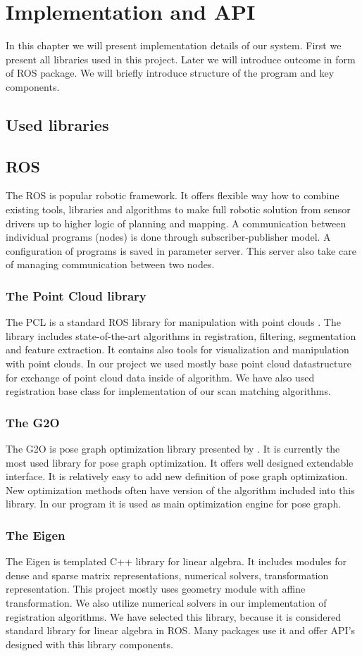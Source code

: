 \chapter{Implementation and API}
In this chapter we will present implementation details of our system. First we present all libraries used in this project. Later we will introduce outcome in form of \gls{ROS} package. We will briefly introduce structure of the program and key components.
\section{Used libraries}
\section {\gls{ROS}}
The \gls{ROS} \cite{ros_papper} is popular robotic framework. It offers flexible way how to combine existing tools, libraries and algorithms to make full robotic solution from sensor drivers up to higher logic of planning and mapping. A communication between individual programs (nodes) is done through subscriber-publisher model. A configuration of programs is saved in parameter server. This server also take care of managing communication between two nodes.  
\subsection{The Point Cloud library}
The \gls{PCL} is a standard \gls{ROS} library for manipulation with point clouds \cite{pcl}. The library includes state-of-the-art algorithms in registration, filtering, segmentation and feature extraction. It contains also tools for visualization and manipulation with point clouds. In our project we used mostly base point cloud datastructure for exchange of point cloud data inside of algorithm. We have also used registration base class for implementation of our scan matching algorithms. 
\subsection{The G2O}
The G2O is pose graph optimization library presented by \cite{g2o}. It is currently the most used library for pose graph optimization. It offers well designed extendable interface. It is relatively easy to add new definition of pose graph optimization. New optimization methods often have version of the algorithm included into this library. In our program it is used as main optimization engine for pose graph.
\subsection{The Eigen}
The Eigen \cite{eigenweb} is templated C++ library for linear algebra. It includes modules for dense and sparse matrix representations, numerical solvers, transformation representation. This project mostly uses geometry module with affine transformation. We also utilize numerical solvers in our implementation of registration algorithms. We have selected this library, because it is considered standard library for linear algebra in \gls{ROS}. Many packages use it and offer API's designed with this library components.   
